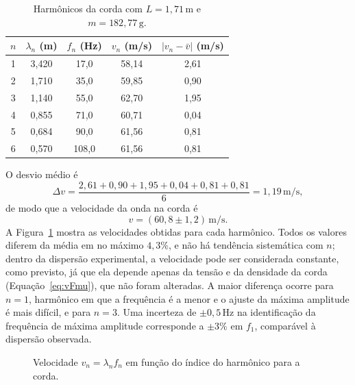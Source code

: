 \documentclass[12pt, a4paper]{article}
\newcommand{\un}[1]{\,\mathrm{#1}}
\newcommand{\fonte}[1]{\par\vspace{2pt}{\footnotesize Fonte: #1}}
\begin{document}
\begin{table}[H]
\centering
\caption{Harmônicos da corda com $L=1{,}71\un{m}$ e $m=182{,}77\un{g}$.}
\label{tab:corda}
\begin{tabular}{ccccc}
\toprule
$n$ & $\lambda_n$ (m) & $f_n$ (Hz) & $v_n$ (m/s) & $|v_n-\bar{v}|$ (m/s) \\
\midrule
1 & 3,420 & 17,0 & 58,14 & 2,61 \\
2 & 1,710 & 35,0 & 59,85 & 0,90 \\
3 & 1,140 & 55,0 & 62,70 & 1,95 \\
4 & 0,855 & 71,0 & 60,71 & 0,04 \\
5 & 0,684 & 90,0 & 61,56 & 0,81 \\
6 & 0,570 & 108,0 & 61,56 & 0,81 \\
\bottomrule
\end{tabular}
\fonte{Elaborada pelos autores.}
\end{table}

O desvio médio é
\[
\Delta v=\frac{2{,}61+0{,}90+1{,}95+0{,}04+0{,}81+0{,}81}{6}=1{,}19\un{m/s},
\]
de modo que a velocidade da onda na corda é
\[
v=(60{,}8\pm1{,}2)\un{m/s}.
\]
A Figura~\ref{fig:vn} mostra as velocidades obtidas para cada harmônico. Todos os valores diferem da média em no máximo $4{,}3\%$, e não há tendência sistemática com $n$; dentro da dispersão experimental, a velocidade pode ser considerada constante, como previsto, já que ela depende apenas da tensão e da densidade da corda (Equação~\ref{eq:vFmu}), que não foram alteradas. A maior diferença ocorre para $n=1$, harmônico em que a frequência é a menor e o ajuste da máxima amplitude é mais difícil, e para $n=3$. Uma incerteza de $\pm0{,}5\un{Hz}$ na identificação da frequência de máxima amplitude corresponde a $\pm3\%$ em $f_1$, comparável à dispersão observada.

\begin{figure}[H]
\centering
\caption{Velocidade $v_n=\lambda_nf_n$ em função do índice do harmônico para a corda.}
\label{fig:vn}
\fonte{Elaborada pelos autores.}
\end{figure}
\end{document}
